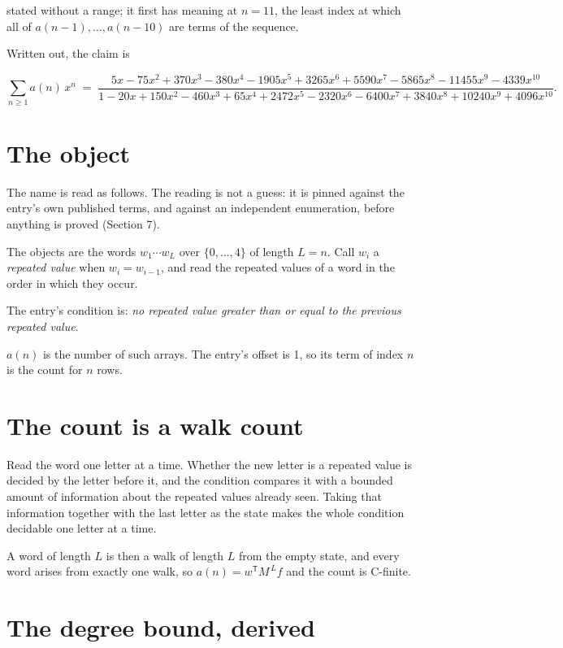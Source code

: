 \documentclass[11pt]{article}
\theoremstyle{definition}
\begin{document}
stated without a range; it first has meaning at $n = 11$, the least index at which all of $a(n-1),\dots,a(n-10)$ are terms of the sequence.

Written out, the claim is

\[\sum_{n \ge 1} a(n)\,x^n \;=\; \frac{5x - 75x^{2} + 370x^{3} - 380x^{4} - 1905x^{5} + 3265x^{6} + 5590x^{7} - 5865x^{8} - 11455x^{9} - 4339x^{10}}{1 - 20x + 150x^{2} - 460x^{3} + 65x^{4} + 2472x^{5} - 2320x^{6} - 6400x^{7} + 3840x^{8} + 10240x^{9} + 4096x^{10}}.\]

\section{The object}

The name is read as follows. The reading is not a guess: it is pinned against the entry's own published terms, and against an independent enumeration, before anything is proved (Section 7).

The objects are the words $w_1\cdots w_L$ over $\{0,\dots,4\}$ of length $L = n$. Call $w_i$ a {\itshape repeated value} when $w_i = w_{i-1}$, and read the repeated values of a word in the order in which they occur.

The entry's condition is: {\itshape no repeated value greater than or equal to the previous repeated value}.

$a(n)$ is the number of such arrays. The entry's offset is 1, so its term of index $n$ is the count for $n$ rows.

\section{The count is a walk count}

Read the word one letter at a time. Whether the new letter is a repeated value is decided by the letter before it, and the condition compares it with a bounded amount of information about the repeated values already seen. Taking that information together with the last letter as the state makes the whole condition decidable one letter at a time.

A word of length $L$ is then a walk of length $L$ from the empty state, and every word arises from exactly one walk, so $a(n) = w^{\mathsf T}M^{\,L}f$ and the count is C-finite.

\section{The degree bound, derived}
\end{document}
